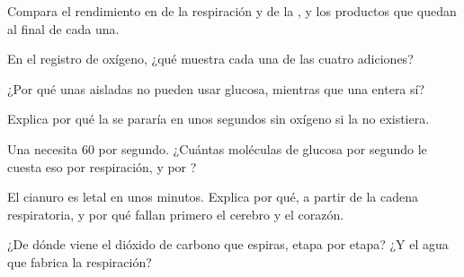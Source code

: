 \begin{exercise}[$\star$]\label{exo:g12:respiration-fermentation:5}
Compara el rendimiento en  de la respiración y de la , y
los productos que quedan al final de cada una.
\end{exercise}

\begin{exercise}[$\star\star$]\label{exo:g12:respiration-fermentation:6}
En el registro de oxígeno, ¿qué muestra cada una de las cuatro
adiciones?
\end{exercise}

\begin{exercise}[$\star\star$]\label{exo:g12:respiration-fermentation:7}
¿Por qué unas  aisladas no pueden usar glucosa, mientras
que una  entera sí?
\end{exercise}

\begin{exercise}[$\star\star$]\label{exo:g12:respiration-fermentation:8}
Explica por qué la  se pararía en unos segundos sin oxígeno
si la  no existiera.
\end{exercise}

\begin{exercise}[$\star\star$]\label{exo:g12:respiration-fermentation:9}
Una  necesita 60  por segundo. ¿Cuántas moléculas de glucosa
por segundo le cuesta eso por respiración, y por ?
\end{exercise}

\begin{exercise}[$\star\star$]\label{exo:g12:respiration-fermentation:10}
El cianuro es letal en unos minutos. Explica por qué, a partir de la
cadena respiratoria, y por qué fallan primero el cerebro y el corazón.
\end{exercise}

\begin{exercise}[$\star\star$]\label{exo:g12:respiration-fermentation:11}
¿De dónde viene el dióxido de carbono que espiras, etapa por etapa? ¿Y
el agua que fabrica la respiración?
\end{exercise}

